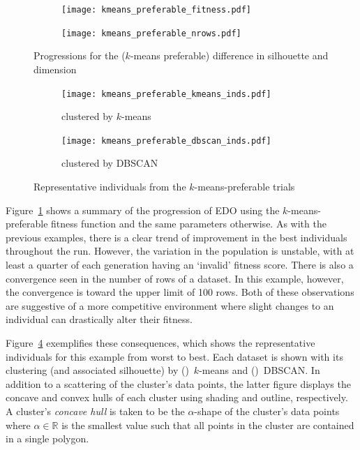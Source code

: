 \begin{figure}
    \centering
    \begin{subfigure}{\imgwidth}
        \texttt{[image: kmeans\_preferable\_fitness.pdf]}
    \end{subfigure}

    \begin{subfigure}{\imgwidth}
        \texttt{[image: kmeans\_preferable\_nrows.pdf]}
    \end{subfigure}
    \caption{%
        Progressions for the (\(k\)-means preferable) difference in silhouette
        and dimension
    }\label{fig:kmeans_preferable_progression}
\end{figure}

\begin{figure}
    \centering
    \begin{subfigure}{.95\textwidth}
        \texttt{[image: kmeans\_preferable\_kmeans\_inds.pdf]}
        \caption{%
            clustered by \(k\)-means
        }\label{fig:kmeans_preferable_kmeans_inds}
    \end{subfigure}

    \vspace{1em}
    \begin{subfigure}{.95\textwidth}
        \texttt{[image: kmeans\_preferable\_dbscan\_inds.pdf]}
        \caption{clustered by DBSCAN}\label{fig:kmeans_preferable_dbscan_inds}
    \end{subfigure}
    \caption{%
        Representative individuals from the \(k\)-means-preferable trials
    }\label{fig:kmeans_preferable_inds}
\end{figure}

Figure~\ref{fig:kmeans_preferable_progression} shows a summary of the
progression of EDO using the \(k\)-means-preferable fitness function and the
same parameters otherwise. As with the previous examples, there is a clear trend
of improvement in the best individuals throughout the run. However, the
variation in the population is unstable, with at least a quarter of each
generation having an `invalid' fitness score. There is also a convergence seen
in the number of rows of a dataset. In this example, however, the convergence is
toward the upper limit of 100 rows. Both of these observations are suggestive of
a more competitive environment where slight changes to an individual can
drastically alter their fitness.

Figure~\ref{fig:kmeans_preferable_inds} exemplifies these consequences, which
shows the representative individuals for this example from worst to best. Each
dataset is shown with its clustering (and associated silhouette) by
()~\(k\)-means and
()~DBSCAN. In addition to a scattering
of the cluster's data points, the latter figure displays the concave and convex
hulls of each cluster using shading and outline, respectively. A cluster's
\emph{concave hull} is taken to be the \(\alpha\)-shape of the cluster's data
points~\cite{Edelsbrunner1983} where \(\alpha \in \mathbb R\) is the smallest
value such that all points in the cluster are contained in a single polygon.

